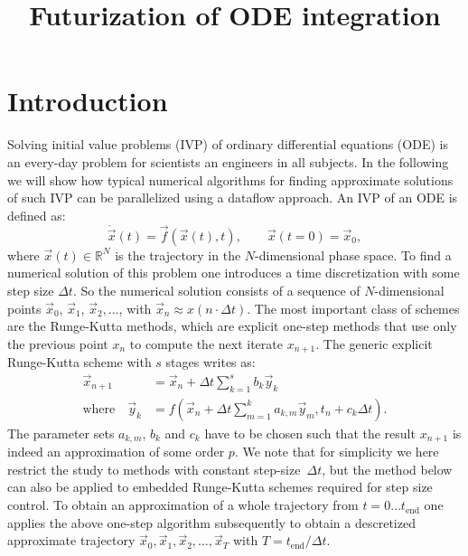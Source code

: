 \documentclass[10pt]{scrartcl}
\title{Futurization of ODE integration}
\author{}
\newcommand{\Dt}{\Delta t}
\begin{document}
\maketitle

\section{Introduction}

Solving initial value problems (IVP) of ordinary differential equations (ODE) is an every-day problem for scientists an engineers in all subjects.
In the following we will show how typical numerical algorithms for finding approximate solutions of such IVP can be parallelized using a dataflow approach.
An IVP of an ODE is defined as:
\begin{equation}
 \dot{\vec x}(t) = \vec f(\vec x(t), t), \qquad \vec x(t=0) = \vec x_0,
\end{equation}
where $\vec x(t) \in \mathbb{R}^N$ is the trajectory in the $N$-dimensional phase space.
To find a numerical solution of this problem one introduces a time discretization with some step size $\Dt$.
So the numerical solution consists of a sequence of $N$-dimensional points $\vec x_0$, $\vec x_1$, $\vec x_2,\dots$, with $\vec x_n \approx x(n\cdot \Dt)$.
The most important class of schemes are the Runge-Kutta methods, which are explicit one-step methods that use only the previous point $x_n$ to compute the next iterate $x_{n+1}$.
The generic explicit Runge-Kutta scheme with $s$ stages writes as:
\begin{equation} \label{eqn:rk}
 \begin{aligned}
    \vec x_{n+1} &= \vec x_n + \Dt \sum_{k=1}^{s} b_k \vec y_k \\
    \text{where}\quad \vec y_k &= f( \vec x_n + \Dt \sum_{m=1}^k a_{k,m} \vec y_m , t_n+c_k\Dt).
   \end{aligned}
\end{equation}
The parameter sets $a_{k,m}$, $b_k$ and $c_k$ have to be chosen such that the result $x_{n+1}$ is indeed an approximation of some order $p$.
We note that for simplicity we here restrict the study to methods with constant step-size~$\Dt$, but the method below can also be applied to embedded Runge-Kutta schemes required for step size control.
To obtain an approximation of a whole trajectory from $t=0\dots t_\text{end}$ one applies the above one-step algorithm subsequently to obtain a descretized approximate trajectory $\vec x_0,\vec x_1,\vec x_2,\dots,\vec x_T$ with $T=t_\text{end}/\Dt$.
\end{document}

